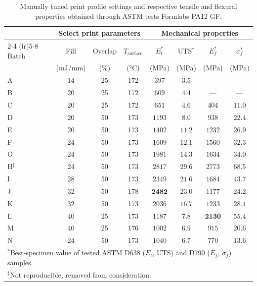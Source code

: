\begin{table}[t]
  \centering
  \begin{tabular}{lccccccc}
    \toprule
    & \multicolumn{3}{c}{Select print parameters} & \multicolumn{4}{c}{Mechanical properties} \\
    \cmidrule(lr){2-4} \cmidrule(lr){5-8}
    Batch & Fill & Overlap & $T_\mathrm{surface}$ & $E_t^{*}$ & UTS$^{*}$ & $E_f^{*}$ & $\sigma_f^{*}$ \\
    & (mJ/mm) & (\%) & (\si{\celsius}) & (MPa) & (MPa) & (MPa) & (MPa) \\
    \midrule
    A   & 14 & 25 & 172 & $397$  & $3.5$  & ---    & ---    \\
    B   & 20 & 25 & 172 & $609$  & $4.4$  & ---    & ---    \\
    C   & 20 & 25 & 172 & $651$  & $4.6$  & $404$  & $11.0$ \\
    D   & 20 & 50 & 173 & $1193$ & $8.0$  & $938$  & $22.4$ \\
    E   & 20 & 50 & 173 & $1402$ & $11.2$ & $1232$ & $26.9$ \\
    F   & 24 & 50 & 173 & $1609$ & $12.1$ & $1560$ & $32.3$ \\
    G   & 24 & 50 & 173 & $1981$ & $14.3$ & $1634$ & $34.0$ \\
    H$^{\ddagger}$ & 24 & 50 & 173 & $2817$ & $29.6$ & $2773$ & $68.5$ \\
    I   & 28 & 50 & 173 & $2349$ & $21.6$ & $1684$ & $43.7$ \\
    J   & 32 & 50 & 178 & $\bm{2482}$ & $\bm{23.0}$ & $1177$ & $24.2$ \\
    K   & 32 & 50 & 173 & $2036$ & $16.7$ & $1233$ & $28.1$ \\
    L   & 40 & 25 & 173 & $1187$ & $7.8$  & $\bm{2130}$ & $\bm{55.4}$ \\
    M   & 40 & 25 & 176 & $1002$ & $6.9$  & $915$  & $20.6$ \\
    N   & 24 & 50 & 173 & $1040$ & $6.7$  & $770$  & $13.6$ \\
    \bottomrule
    \multicolumn{8}{l}{\footnotesize $^{*}$Best-specimen value of tested
      ASTM D638 (\(E_t\), UTS) and D790 (\(E_f\), \(\sigma_f\)) samples.} \\
    \multicolumn{8}{l}{\footnotesize $^{\ddagger}$Not reproducible, removed from consideration.} \\
  \end{tabular}
  \caption{
    Manually tuned print profile settings and respective tensile and flexural
    properties obtained through ASTM tests Formlabs PA12 GF.
  }
  \label{tab:agentic-sls-material-1}
\end{table}

